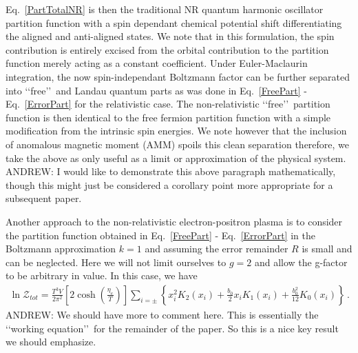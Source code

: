 \documentclass[Universe,article,submit,moreauthors,pdftex]{Definitions/mdpi}
\newcommand*{\req}[1]{Eq.~{\eqref{#1}}}
\newcommand*{\xred}{\color{red}}
\begin{document}
\req{PartTotalNR} is then the traditional NR quantum harmonic oscillator partition function with a spin dependant chemical potential shift differentiating the aligned and anti-aligned states. We note that in this formulation, the spin contribution is entirely excised from the orbital contribution to the partition function merely acting as a constant coefficient. Under Euler-Maclaurin integration, the now spin-independant Boltzmann factor can be further separated into \lq\lq free\rq\rq\ and Landau quantum parts as was done in \req{FreePart} - \req{ErrorPart} for the relativistic case. The non-relativistic \lq\lq free\rq\rq\ partition function is then identical to the free fermion partition function with a simple modification from the intrinsic spin energies. We note however that the inclusion of anomalous magnetic moment (AMM) spoils this clean separation therefore, we take the above as only useful as a limit or approximation of the physical system. {\xred ANDREW: I would like to demonstrate this above paragraph mathematically, though this might just be considered a corollary point more appropriate for a subsequent paper.}

Another approach to the non-relativistic electron-positron plasma is to consider the partition function obtained in \req{FreePart} - \req{ErrorPart} in the Boltzmann approximation $k=1$ and assuming the error remainder $R$ is small and can be neglected. Here we will not limit ourselves to $g=2$ and allow the g-factor to be arbitrary in value. In this case, we have
\begin{align}
  \label{lnZ}
  \ln\mathcal{Z}_{tot}=\frac{T^3V}{2\pi^2}\left[2\cosh\left(\frac{\eta_{e}}{T}\right)\right]\sum_{i=\pm}\left\{x_i^{2} K_2\left(x_i\right)+\frac{b_0}{2}x_iK_1\left(x_i\right)+\frac{b^2_0}{12}K_0\left(x_i\right)\right\}\,.
\end{align}
{\xred ANDREW: We should have more to comment here. This is essentially the \lq\lq working equation\rq\rq\ for the remainder of the paper. So this is a nice key result we should emphasize.}
\end{document}
